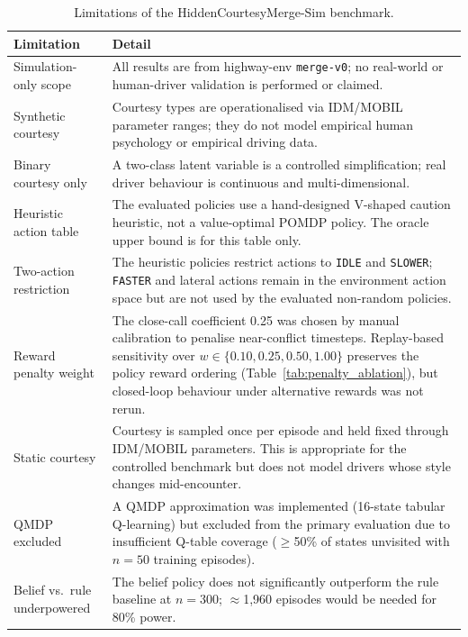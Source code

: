 \begin{table}[htbp]
\centering
\caption{Limitations of the HiddenCourtesyMerge-Sim benchmark.}
\label{tab:limitations}
\small
\begin{tabular}{p{3.4cm}p{9.0cm}}
\toprule
\textbf{Limitation} & \textbf{Detail} \\
\midrule
Simulation-only scope
  & All results are from highway-env \texttt{merge-v0}; no real-world or
    human-driver validation is performed or claimed. \\
Synthetic courtesy
  & Courtesy types are operationalised via IDM/MOBIL parameter ranges; they
    do not model empirical human psychology or empirical driving data. \\
Binary courtesy only
  & A two-class latent variable is a controlled simplification; real driver
    behaviour is continuous and multi-dimensional. \\
Heuristic action table
  & The evaluated policies use a hand-designed V-shaped caution heuristic,
    not a value-optimal POMDP policy. The oracle upper bound is for this
    table only. \\
Two-action restriction
  & The heuristic policies restrict actions to \texttt{IDLE} and
    \texttt{SLOWER}; \texttt{FASTER} and lateral actions remain in the
    environment action space but are not used by the evaluated non-random
    policies. \\
Reward penalty weight
  & The close-call coefficient 0.25 was chosen by manual calibration to
    penalise near-conflict timesteps. Replay-based sensitivity over
    $w\in\{0.10,0.25,0.50,1.00\}$ preserves the policy reward ordering
    (Table~\ref{tab:penalty_ablation}), but closed-loop behaviour under
    alternative rewards was not rerun. \\
Static courtesy
  & Courtesy is sampled once per episode and held fixed through IDM/MOBIL
    parameters. This is appropriate for the controlled benchmark but does not
    model drivers whose style changes mid-encounter. \\
QMDP excluded
  & A QMDP approximation was implemented (16-state tabular Q-learning) but
    excluded from the primary evaluation due to insufficient Q-table coverage
    ($\ge$50\% of states unvisited with $n{=}50$ training episodes). \\
Belief vs.\ rule underpowered
  & The belief policy does not significantly outperform the rule baseline
    at $n{=}300$; $\approx$1{,}960 episodes would be needed for 80\% power. \\

\end{tabular}
\end{table}
